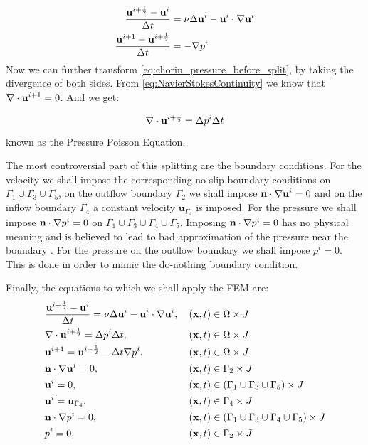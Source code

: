 \begin{align}
	\frac{\mathbf{u}^{i + \frac{1}{2}} - \mathbf{u}^{i}}{\Delta t} &= \nu \Delta \mathbf{u}^i - \mathbf{u}^i \cdot \nabla\mathbf{u}^i \label{eq:chorin_tentative_velocity}\\
	\frac{\mathbf{u}^{i+1} - \mathbf{u}^{i + \frac{1}{2}}}{\Delta t} &= - \nabla p^i \label{eq:chorin_pressure_before_split}
\end{align}
Now we can further transform \cref{eq:chorin_pressure_before_split}, by taking the divergence of both sides. From \cref{eq:NavierStokesContinuity} we know that $\nabla\cdot\mathbf{u}^{i+1} = 0$. And we get:

\begin{equation*}
	\nabla\cdot\mathbf{u}^{i + \frac{1}{2}} = \Delta p^i \Delta t
\end{equation*}
known as the Pressure Poisson Equation.

The most controversial part of this splitting are the boundary conditions. For the velocity we shall impose the corresponding no-slip boundary conditions on $\Gamma_1 \cup \Gamma_3 \cup \Gamma_5$, on the outflow boundary $\Gamma_2$ we shall impose $\mathbf{n} \cdot \nabla\mathbf{u}^i = 0$ and on the inflow boundary $\Gamma_4$ a constant velocity $\mathbf{u}_{\Gamma_4}$ is imposed. For the pressure we shall impose $\mathbf{n} \cdot \nabla p^i = 0$ on $\Gamma_1 \cup \Gamma_3 \cup \Gamma_4 \cup \Gamma_5$. Imposing $\mathbf{n} \cdot \nabla p^i = 0$ has no physical meaning and is believed to lead to bad approximation of the pressure near the boundary \cite{Larson-Bengzon}. For the pressure on the outflow boundary we shall impose $p^i = 0$. This is done in order to mimic the do-nothing boundary condition.

Finally, the equations to which we shall apply the FEM are:
\begin{align}
	&\frac{\mathbf{u}^{i + \frac{1}{2}} - \mathbf{u}^{i}}{\Delta t} = \nu \Delta \mathbf{u}^i - \mathbf{u}^i \cdot \nabla\mathbf{u}^i, && \left(\mathbf{x}, t\right) \in \Omega \times J \label{eq:NS_PPE_Final_Split_advect} \\
	&\nabla\cdot\mathbf{u}^{i + \frac{1}{2}} = \Delta p^i \Delta t, && \left(\mathbf{x}, t\right) \in \Omega \times J  \label{eq:NS_PPE_Final_Split_PPE} \\
	&\mathbf{u}^{i+1} = \mathbf{u}^{i+\frac{1}{2}} - \Delta t \nabla p^{i}, && \left(\mathbf{x}, t\right) \in \Omega \times J\label{eq:NS_Final_Split_final_velocity}  \\
  &\mathbf{n} \cdot \nabla\mathbf{u}^i = 0, && \left(\mathbf{x}, t\right) \in \Gamma_2 \times J \\
  &\mathbf{u}^i = 0, &&\left(\mathbf{x}, t\right) \in \left(\Gamma_1 \cup \Gamma_3 \cup \Gamma_5\right) \times J \\
  &\mathbf{u}^i = \mathbf{u}_{\Gamma_4}, && \left(\mathbf{x}, t\right) \in \Gamma_4 \times J \\
  &\mathbf{n} \cdot \nabla p^i = 0, && \left(\mathbf{x}, t\right) \in (\Gamma_1 \cup \Gamma_3 \cup \Gamma_4 \cup \Gamma_5) \times J \\
  &p^i = 0, && \left(\mathbf{x}, t\right) \in \Gamma_2 \times J
\end{align}

